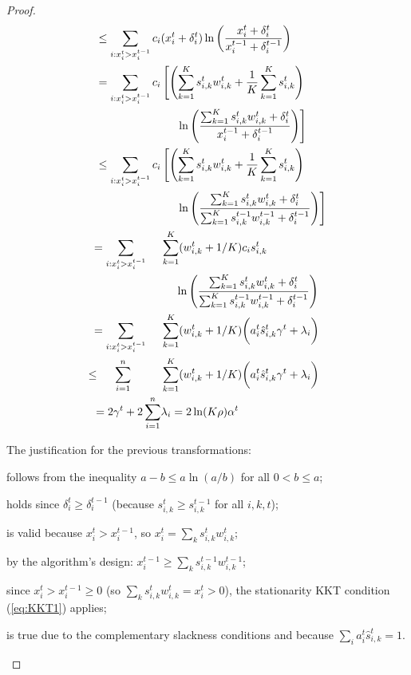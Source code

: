 \begin{proof}
\begin{align}
    \leq \sum_{i: x_{i}^{t} > x_{i}^{t-1}} c_{i} & (x_{i}^{t} + \delta_{i}^{t}) \ln \left(\frac{x_{i}^{t} + \delta_{i}^{t}}{x_{i}^{t-1} + \delta_{i}^{t-1}}\right) \\
    = \sum_{i: x_{i}^{t} > x_{i}^{t-1}} c_{i} & \left[ \left(\sum_{k=1}^{K}  s_{i,k}^{t} w_{i,k}^{t} + \frac{1}{K} \sum_{k=1}^{K} s_{i,k}^{t} \right)  \notag  \right. \\
		& \left. \ \ \ \ \ln \left(\frac{ \sum_{k=1}^{K}  s_{i,k}^{t} w_{i,k}^{t} + \delta_{i}^{t}}{x_{i}^{t-1} + \delta_{i}^{t-1}}  \right) \right] \\
    \leq \sum_{i: x_{i}^{t} > x_{i}^{t-1}} c_{i} & \left[ \left(\sum_{k=1}^{K}  s_{i,k}^{t} w_{i,k}^{t} + \frac{1}{K} \sum_{k=1}^{K} s_{i,k}^{t} \right) \notag \right. \\
            & \left. \ \ \ \ \ln \left(\frac{ \sum_{k=1}^{K} s_{i,k}^{t} w_{i,k}^{t} + \delta_{i}^{t}}{\sum_{k=1}^{K}  s_{i,k}^{t-1} w_{i,k}^{t-1} + \delta_{i}^{t-1}}  \right) \right]\\
    = \sum_{i: x_{i}^{t} > x_{i}^{t-1}} \ \ \ \ & \sum_{k=1}^{K} (w_{i,k}^{t} + 1/K) c_{i} s_{i,k}^{t} \notag \\
            & \ \ \ \ \ln \left(\frac{ \sum_{k=1}^{K} s_{i,k}^{t} w_{i,k}^{t}  + \delta_{i}^{t}}{\sum_{k=1}^{K} s_{i,k}^{t-1} w_{i,k}^{t-1}  + \delta_{i}^{t-1}}  \right) \notag \\
    = \sum_{i: x_{i}^{t} > x_{i}^{t-1}} \ \ \ \ & \sum_{k=1}^{K} (w_{i,k}^{t} + 1/K) \biggl( a_{i}^{t} \hat{s}_{i,k}^{t} \gamma^t + \lambda_{i} \biggr) \\
    \leq \ \ \ \ \sum_{i=1}^{n} \ \ \ \ \ \ \ \ & \sum_{k=1}^{K} (w_{i,k}^{t} + 1/K) \biggl( a_{i}^{t} \hat{s}_{i,k}^{t} \gamma^t + \lambda_{i} \biggr) \notag \\
    = 2 \gamma^{t} + 2 \sum_{i=1}^{n} & \lambda_{i} = 2\ln(K \rho) \alpha^{t}
\end{align}

The justification for the previous transformations:
\begin{compactenum}[(1)]
	\setcounter{enumi}{1}
	\item follows from the inequality $a - b \leq a \ln(a/b)$ for all $0 < b \leq a$;
	\item holds since $\delta_{i}^{t} \geq \delta_{i}^{t-1}$ (because $s_{i,k}^{t} \geq s_{i,k}^{t-1}$ for all $i,k,t$);
	\item is valid because $x_{i}^{t} > x_{i}^{t-1}$, so $x_{i}^{t} = \sum_{k}  s_{i,k}^{t} w_{i,k}^{t}$;
	\item by the algorithm's design: $x_{i}^{t-1} \geq \sum_{k}  s_{i,k}^{t-1} w_{i,k}^{t-1}$;
	\setcounter{enumi}{5}
	\item since $x_{i}^{t} > x_{i}^{t-1} \geq 0$
	(so $\sum_{k}  s_{i,k}^{t} w_{i,k}^{t} = x_{i}^{t} > 0$), the stationarity KKT condition (\ref{eq:KKT1}) applies;
	\item is true due to the complementary slackness conditions
		and because $\sum_{i} a_{i}^{t}  \hat{s}_{i,k}^{t} = 1$.
\end{compactenum}
\end{proof}

